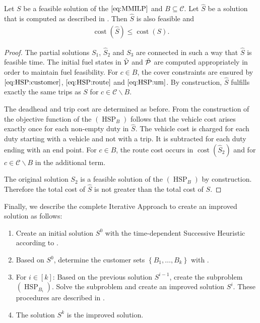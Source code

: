 \begin{lemma}
\label{lem:feasibility_hsp}

Let $S$ be a feasible solution of the $\eqref{eq:MMILP}$ and $B\subseteq\mathcal{C}$. Let $\widehat{S}$ be a solution that is computed as described in . Then $\widehat{S}$ is also feasible and
\begin{align*}
	\operatorname{cost}\left(\widehat{S}\right) \leq \operatorname{cost}\left(S\right).
\end{align*}

\end{lemma}

\begin{proof}

The partial solutions $S_1$, $\widehat{S}_2$ and $S_3$ are connected in such a way that $\widehat{S}$ is feasible \wrt time. The initial fuel states in $\hat{\mathcal{V}}$ and $\hat{\mathcal{P}}$ are computed appropriately in order to maintain fuel feasibility. For ${c\in B}$, the cover constraints are ensured by $\eqref{eq:HSP:customer}$, $\eqref{eq:HSP:route}$ and $\eqref{eq:HSP:um}$. By construction, $\widehat{S}$ fulfills exactly the same trips as $S$ for ${c\in\mathcal{C}\backslash B}$.

The deadhead and trip cost are determined as before. From the construction of the objective function of the $(\operatorname{HSP}_B)$ follows that the vehicle cost arises exactly once for each non-empty duty in $\widehat{S}$. The vehicle cost is charged for each duty starting with a vehicle and not with a trip. It is subtracted for each duty ending with an end point. For ${c\in B}$, the route cost occurs in $\operatorname{cost}\left(\widehat{S}_2\right)$ and for ${c\in\mathcal{C}\backslash B}$ in the additional term.

The original solution $S_2$ is a feasible solution of the $(\operatorname{HSP}_B)$ by construction. Therefore the total cost of $\widehat{S}$ is not greater than the total cost of $S$.
%
\end{proof}

Finally, we describe the complete Iterative Approach to create an improved solution as follows:
\begin{enumerate}
	\item Create an initial solution $S^0$ with the time-dependent Successive Heuristic according to .
	\item Based on $S^0$, determine the customer sets $\left\{B_1,\dots,B_k\right\}$ with .
	\item For $i\in[k]$: Based on the previous solution $S^{i-1}$, create the subproblem $(\operatorname{HSP}_{B_i})$. Solve the subproblem and create an improved solution $S^i$. These procedures are described in .
	\item The solution $S^k$ is the improved solution.
\end{enumerate}

